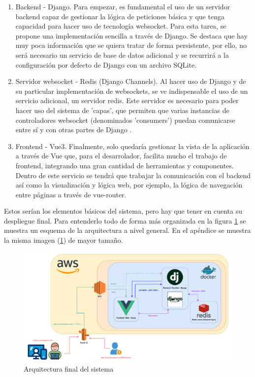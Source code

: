 \begin{enumerate}
	\item Backend - Django. Para empezar, es fundamental el uso de un servidor backend capaz de
	      gestionar la lógica de peticiones básica y que tenga capacidad para hacer uso de tecnología websocket.
	      Para esta tarea, se propone una implementación sencilla a través de Django. Se destaca que hay muy poca información que se
	      quiera tratar de forma persistente, por ello, no será necesario un servicio de base de datos adicional
	      y se recurrirá a la configuración por defecto de Django con un archivo SQLite.
	\item Servidor websocket - Redis (Django Channels). Al hacer uso de Django y de su particular implementación de
	      websockets, se ve indispensable el uso de un servicio adicional, un servidor redis. Este servidor es necesario para
	      poder hacer uso del sistema de 'capas', que permiten que varias instancias de controladores websocket
	      (denominados 'consumers') puedan comunicarse entre sí y con otras partes de Django \cite{djangoChannelsLayers}.
	\item Frontend - Vue3. Finalmente, solo quedaría gestionar la vista de la aplicación a través de Vue
	      que, para el desarrolador, facilita mucho el trabajo de frontend, integrando una gran cantidad de herramientas y componentes.
	      Dentro de este servicio se tendrá que trabajar la comunicación con el backend así como la visualización y lógica
	      web, por ejemplo, la lógica de navegación entre páginas a través de vue-router.
\end{enumerate}

Estos serían los elementos básicos del sistema, pero hay que tener en cuenta su
despliegue final. Para entenderlo todo de forma más organizada en la figura \ref{fig:res_arquitecturaSoftware} se muestra un esquema de la arquitectura
a nivel general. En el apéndice se muestra la misma imagen (\ref{fig:res_arquitecturaSoftware}) de mayor tamaño.

\begin{figure}[h]
	\centering
	\includegraphics[width=\textwidth,clip=true]{res_arquitecturaSoftware.pdf}
	\caption{Arquitectura final del sistema}
	\label{fig:res_arquitecturaSoftware}
\end{figure}

